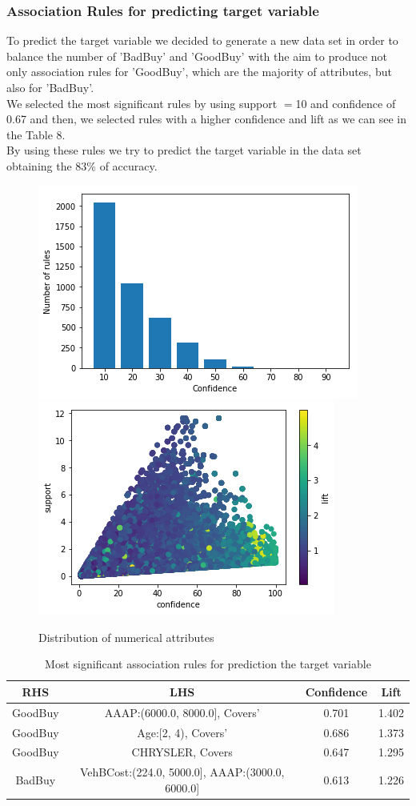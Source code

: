 \documentclass{article}
\begin{document}
	
	\subsubsection{Association Rules for predicting target variable}
	To predict the target variable we decided to generate a new data set in order to balance the number of 'BadBuy' and 'GoodBuy' with the aim to produce not only association rules for 'GoodBuy', which are the majority of attributes, but also for 'BadBuy'.\\
	We selected the most significant rules  by using support $=$10 and confidence of 0.67 and then, we selected rules with a higher confidence and lift as we can see in the Table 8.\\
	By using these rules we try to predict the target variable in the data set obtaining the 83\% of accuracy.\\
	
	
	\begin{figure}[H]
		\centering
		\includegraphics[width=.4\textwidth]{rules.png}\hspace{1cm}
		\includegraphics[width=.4\textwidth]{AbusivismoEdilizio.png}
		\caption{Distribution of numerical attributes}
		\label{fig:hyper_rf}
	\end{figure}
	
	
	
	
	\begin{table}[H]
		\centering
		\begin{tabular}{|cc|cc|}
			\hline
			\textbf{RHS} & \textbf{LHS} & \textbf{Confidence} & \textbf{Lift} \\
			\hline
			\rowcolor{Gray}
			GoodBuy & AAAP:(6000.0, 8000.0], Covers'  & 0.701 & 1.402 \\
			GoodBuy & Age:[2, 4), Covers' & 0.686 & 1.373 \\
			\rowcolor{Gray}
			GoodBuy &  CHRYSLER, Covers &  0.647 & 1.295 \\
			BadBuy &  VehBCost:(224.0, 5000.0], AAAP:(3000.0, 6000.0] & 0.613 & 1.226\\
			\hline
		\end{tabular}
		\caption{Most significant association rules for prediction the target variable}
	\end{table}
	
\end{document}
